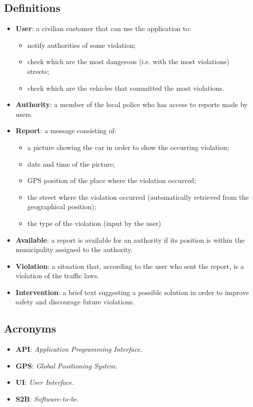 \documentclass[12pt,a4paper]{report}
\begin{document}
		\subsection{Definitions}
		\begin{itemize}
		\item \textbf{User}: a civilian customer that can use the application to:
			\begin{itemize}
			\item notify authorities of some violation;
			\item check which are the most dangerous (i.e. with the most violations) streets;
			\item check which are the vehicles that committed the most violations.
			\end{itemize}
		\item \textbf{Authority}: a member of the local police who has access to reports made by users.
		\item \textbf{Report}: a message consisting of:
			\begin{itemize}
			\item a picture showing the car in order to show the occurring violation;
			\item date and time of the picture;
			\item GPS position of the place where the violation occurred;
			\item the street where the violation occurred (automatically retrieved from the geographical position);
			\item the type of the violation (input by the user)
			\end{itemize}
		\item \textbf{Available}: a report is available for an authority if its position is within the municipality assigned to the authority.
		\item \textbf{Violation}: a situation that, according to the user who sent the report, is a violation of the traffic laws.
		\item \textbf{Intervention}: a brief text suggesting a possible solution in order to improve safety and discourage future violations.
		\end{itemize}
		\subsection{Acronyms}
			\begin{itemize}
			\item \textbf{API}: \emph{Application Programming Interface.}
			\item \textbf{GPS}: \emph{Global Positioning System.}
			\item \textbf{UI}: \emph{User Interface.}		
			\item \textbf{S2B}: \emph{Software-to-be.}	
			\end{itemize}
\end{document}
